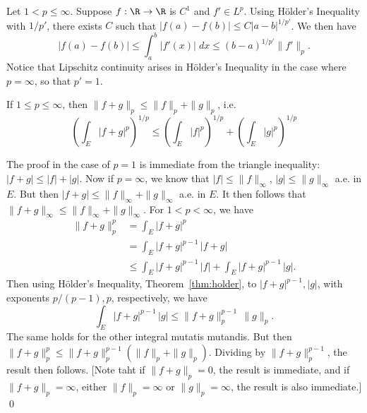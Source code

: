\begin{ex}
Let $1 < p \leq \infty$. Suppose $f: \R \to \R$ is $C^1$ and $f' \in L^p$. Using H\"older's Inequality with $1/p'$, there exists $C$ such that $|f(a)-f(b)| \leq C |a-b|^{1/p'}$. We then have
	\[
	| f(a) - f(b)| \leq \int_a^b |f'(x)| \; dx \leq (b-a)^{1/p'} \|f'\|_p.
	\]
Notice that Lipschitz continuity arises in H\"older's Inequality in the case where $p=\infty$, so that $p'=1$. \xqed
\end{ex}  
















































\begin{thm} \label{thm:mink}
If $1 \leq p \leq \infty$, then $\|f+g\|_p \leq \|f\|_p + \|g\|_p$, i.e.
	\[
	\left( \int_E |f+g|^p \right)^{1/p} \leq \left( \int_E |f|^p \right)^{1/p} + \left( \int_E |g|^p \right)^{1/p}
	\]
\end{thm}

\pf The proof in the case of $p=1$ is immediate from the triangle inequality: $|f+g| \leq |f|+|g|$. Now if $p= \infty$, we know that $|f| \leq \|f\|_\infty$, $|g| \leq \|g\|_\infty$ a.e. in $E$. But then $|f+g| \leq \|f\|_\infty + \|g\|_\infty$ a.e. in $E$. It then follows that $\|f+g\|_\infty \leq \|f\|_\infty + \|g\|_\infty$. For $1<p<\infty$, we have
	\[
	\begin{split}
	\| f+g \|_p^p&= \int_E |f+g|^p \\
	&= \int_E |f+g|^{p-1} \, |f+g| \\
	&\leq \int_E |f+g|^{p-1} \, |f| + \int_E |f+g|^{p-1} \, |g|.
	\end{split}
	\]
Then using H\"older's Inequality, Theorem~\ref{thm:holder}, to $|f+g|^{p-1}, |g|$, with exponents $p/(p-1), p$, respectively, we have
	\[
	\int_E |f+g|^{p-1} \, |g| \leq \|f+g\|_p^{p-1} \, \|g\|_p.
	\]
The same holds for the other integral mutatis mutandis. But then $\|f+g\|_p^p \leq \|f+g\|_p^{p-1} ( \|f\|_p + \|g\|_p)$. Dividing by $\|f+g\|_p^{p-1}$, the result then follows. [Note taht if $\|f+g\|_p=0$, the result is immediate, and if $\|f+g\|_p=\infty$, either $\|f\|_p=\infty$ or $\|g\|_p=\infty$, the result is also immediate.] \qed \\


